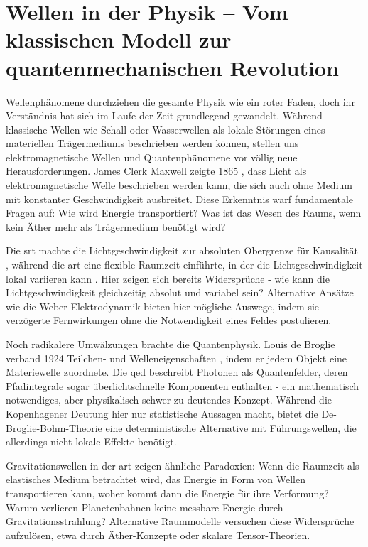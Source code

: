 \section{Wellen in der Physik – Vom klassischen Modell zur quantenmechanischen Revolution}
Wellenphänomene durchziehen die gesamte Physik wie ein roter Faden, doch ihr Verständnis hat sich im Laufe der Zeit grundlegend gewandelt. Während klassische Wellen wie Schall
oder Wasserwellen als lokale Störungen eines materiellen Trägermediums beschrieben werden können, stellen uns elektromagnetische Wellen und Quantenphänomene vor völlig neue
Herausforderungen. James Clerk Maxwell zeigte 1865 \cite{Maxwell1865}, dass Licht als elektromagnetische Welle beschrieben werden kann, die sich auch ohne Medium mit konstanter
Geschwindigkeit ausbreitet. Diese Erkenntnis warf fundamentale Fragen auf: Wie wird Energie transportiert? Was ist das Wesen des Raums, wenn kein Äther mehr als Trägermedium benötigt wird?

Die \gls{srt} machte die Lichtgeschwindigkeit zur absoluten Obergrenze für Kausalität \cite{Einstein1905}, während die \gls{art} eine flexible Raumzeit einführte, in der die
Lichtgeschwindigkeit lokal variieren kann \cite{MisnerThorneWheeler}. Hier zeigen sich bereits Widersprüche - wie kann die Lichtgeschwindigkeit gleichzeitig absolut und variabel sein?
Alternative Ansätze wie die Weber-Elektrodynamik \cite{Weber1846, WeberElectrodynamics} bieten hier mögliche Auswege, indem sie verzögerte Fernwirkungen ohne die Notwendigkeit eines
Feldes postulieren.

Noch radikalere Umwälzungen brachte die Quantenphysik. Louis de Broglie verband 1924 Teilchen- und Welleneigenschaften \cite{deBroglie1924}, indem er jedem Objekt eine Materiewelle zuordnete.
Die \gls{qed} beschreibt Photonen als Quantenfelder, deren Pfadintegrale sogar überlichtschnelle Komponenten enthalten \cite{FeynmanQED_Pfadintegrale} - ein mathematisch notwendiges,
aber physikalisch schwer zu deutendes Konzept. Während die Kopenhagener Deutung hier nur statistische Aussagen macht, bietet die De-Broglie-Bohm-Theorie \cite{Bohm1952} eine deterministische
Alternative mit Führungswellen, die allerdings nicht-lokale Effekte benötigt.

Gravitationswellen \cite{LIGO2016} in der \gls{art} zeigen ähnliche Paradoxien: Wenn die Raumzeit als elastisches Medium betrachtet wird, das Energie in Form von Wellen transportieren kann, woher kommt
dann die Energie für ihre Verformung? Warum verlieren Planetenbahnen keine messbare Energie durch Gravitationsstrahlung? Alternative Raummodelle versuchen diese Widersprüche aufzulösen,
etwa durch Äther-Konzepte oder skalare Tensor-Theorien.

